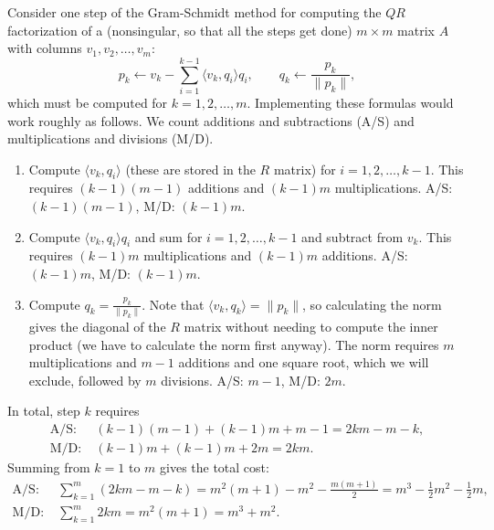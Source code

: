 \documentclass{homework}
\begin{document}
	\question
	\begin{alphaparts}
		\questionpart Consider one step of the Gram-Schmidt method for computing the $QR$ factorization of a (nonsingular, so that all the steps get done) $m\times m$ matrix $A$ with columns $v_1, v_2, \dots, v_m$:
		\begin{equation*}
			p_k \gets v_k -\sum_{i=1}^{k-1}\langle v_k, q_i\rangle q_i, \qquad q_k \gets \frac{p_k}{\lVert p_k\rVert},
		\end{equation*}
		which must be computed for $k =1,2,\dots, m$. Implementing these formulas would work roughly as follows. We count additions and subtractions (A/S) and multiplications and divisions (M/D).
		\begin{enumerate}[label=\arabic*.]
			\item Compute $\langle v_k, q_i\rangle$ (these are stored in the $R$ matrix) for $i =1,2,\dots, k-1$. This requires ${(k-1)(m-1)}$ additions and $(k-1)m$ multiplications. A/S: $(k-1)(m-1)$, M/D: $(k-1)m$.
			\item Compute $\langle v_k, q_i\rangle q_i$ and sum for $i=1,2,\dots, k-1$ and subtract from $v_k$. This requires $(k-1)m$ multiplications and $(k-1)m$ additions. A/S: $(k-1)m$, M/D: $(k-1)m$.
			\item Compute $q_k = \frac{p_k}{\lVert p_k\rVert}$. Note that $\langle v_k, q_k\rangle = \lVert p_k\rVert$, so calculating the norm gives the diagonal of the $R$ matrix without needing to compute the inner product (we have to calculate the norm first anyway). The norm requires $m$ multiplications and $m-1$ additions and one square root, which we will exclude, followed by $m$ divisions. A/S: $m-1$, M/D: $2m$.
		\end{enumerate}
		In total, step $k$ requires 
		\begin{align*}
			\text{A/S:}&\; (k-1)(m-1) + (k-1)m + m-1 = 2km - m - k, \\
			\text{M/D:}&\; (k-1)m + (k-1)m + 2m = 2km.
		\end{align*}
		Summing from $k=1$ to $m$ gives the total cost:
		\begin{align*}
			\text{A/S:}&\; \sum_{k=1}^m(2km - m -k) = m^2(m+1) - m^2 - \frac{m(m+1)}{2} = m^3 - \frac{1}{2}m^2 - \frac{1}{2}m, \\
			\text{M/D:}&\; \sum_{k=1}^m2km =m^2(m+1) = m^3 + m^2.
		\end{align*}
		

\end{alphaparts}
\end{document}
